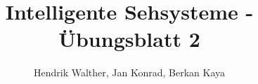 \documentclass[deutsch]{llncs}
\begin{document}
\title{Intelligente Sehsysteme - Übungsblatt 2}


\author{Hendrik Walther, Jan Konrad, Berkan Kaya}
\institute{}
\maketitle


\newpage




\newpage


\newpage

\end{document}
